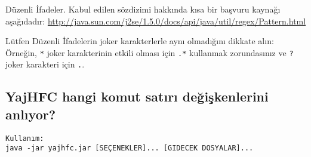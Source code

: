 \documentclass[a4paper,10pt]{scrartcl}
\begin{document}
Düzenli İfadeler. Kabul edilen sözdizimi hakkında kısa bir başvuru kaynağı aşağıdadır:
\url{http://java.sun.com/j2se/1.5.0/docs/api/java/util/regex/Pattern.html}

Lütfen Düzenli İfadelerin joker karakterlerle aynı olmadığını dikkate alın:
Örneğin, \verb.*. joker karakterinin etkili olması için \verb#.*# kullanmak zorundasınız 
ve \verb#?# joker karakteri için \verb#.#.

\subsection{YajHFC hangi komut satırı değişkenlerini anlıyor?}

\begin{verbatim}
Kullanım:
java -jar yajhfc.jar [SEÇENEKLER]... [GIDECEK DOSYALAR]...


\end{verbatim}
\end{document}
